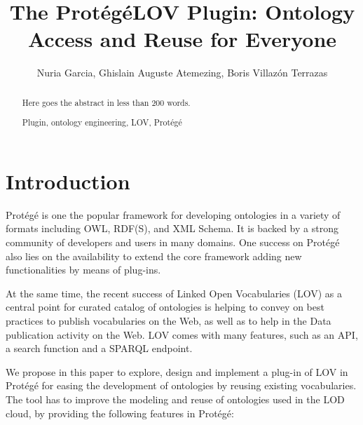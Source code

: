 \documentclass[runningheads,a4paper]{llncs}
\newcommand{\keywords}[1]{\par\addvspace\baselineskip
\noindent\keywordname\enspace\ignorespaces#1}
\begin{document}

\title{The Prot{\'e}g{\'e}LOV Plugin: Ontology Access and Reuse for Everyone }


\author{ Nuria Garcia, Ghislain Auguste Atemezing, Boris Villaz{\'o}n Terrazas }


	


\maketitle


\begin{abstract}
Here goes the abstract in less than 200 words.

\keywords{Plugin, ontology engineering, LOV, Prot{\'e}g{\'e}} 
\end{abstract}


\section{Introduction}\label{sec:introduction}

Prot{\'e}g{\'e} is one the popular framework for developing ontologies in a variety of formats including OWL, RDF(S), and XML Schema. It is backed by a strong community of developers and users in many domains. One success on Prot{\'e}g{\'e} also lies on the availability to extend the core framework adding new functionalities by means of plug-ins.

At the same time, the recent success of Linked Open Vocabularies (LOV) as a central point for curated catalog of ontologies is helping to convey on best practices to publish vocabularies on the Web, as well as to help in the Data publication activity on the Web. LOV comes with many features, such as an API, a search function and a SPARQL endpoint.
 
We propose in this paper to explore, design and implement a plug-in of LOV in Prot{\'e}g{\'e} for easing the development of ontologies by reusing existing vocabularies. 
The tool has to improve the modeling and reuse of ontologies used in the LOD cloud, by providing the following features in Prot{\'e}g{\'e}:
\end{document}
